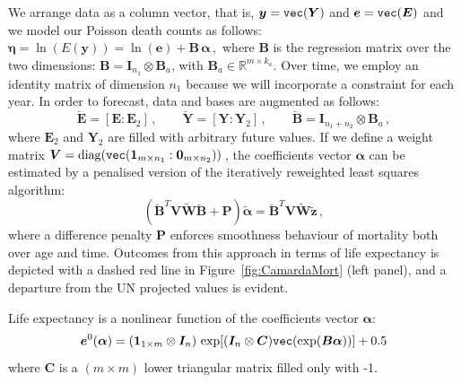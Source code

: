 \documentclass[twoside]{report}
\begin{document}
We arrange data as a column vector, that is, $\bm{y} = \verb"vec"(\bm{Y})$ and $\bm{e} = \verb"vec"(\bm{E})$ and we model our Poisson death counts as follows: $\bm{\eta} = \ln(E(\bm{y})) = \ln(\bm{e})+ \bm{B}\,\bm{\alpha}\, , $ where $\bm{B}$ is the regression matrix over the two dimensions: $\bm{B} = \bm{I}_{n_{1}} \otimes \bm{B}_{a}$, with $\bm{B}_{a} \in \mathbb{R}^{m \times k_{a}}$. Over time, we employ an identity matrix of dimension $n_{1}$ because we will incorporate a constraint for each year. In order to forecast, data and bases are augmented as follows:
\begin{equation}\label{eq:AugData}
\breve{\bm{E}} = [\bm{E} : \bm{E}_{2}]\, , \qquad 
\breve{\bm{Y}} = [\bm{Y} : \bm{Y}_{2}]\, , \qquad
\breve{\bm{B}} = \bm{I}_{n_{1}+n_{2}} \otimes \bm{B}_{a}
\, ,
\end{equation}
where $\bm{E}_{2}$ and $\bm{Y}_{2}$ are filled with arbitrary future values. If we define a weight matrix $\bm{V} = \mathrm{diag}(\verb"vec"(\bm{1}_{m\times n_{1}}:\bm{0}_{m\times n_{2}}))\,$, the coefficients vector $\bm{\alpha}$
can be estimated by a penalised version of the iteratively reweighted least squares algorithm: 
\begin{equation}\label{eq:penIRWLSfor}
(\breve{\bm{B}}^{T} \bm{V} \tilde{\bm{W}} \breve{\bm{B}} + \bm{P}) \tilde{\bm{\alpha}} =
\breve{\bm{B}}^{T}\bm{V} \tilde{\bm{W}}\tilde{\bm{z}} \, ,
\end{equation} 	
where a difference penalty $\bm{P}$ enforces smoothness behaviour of mortality both over age and time. Outcomes from this approach in terms of life expectancy is depicted with a dashed red line in Figure~\ref{fig:CamardaMort} (left panel), and a departure from the UN projected values is evident. 

Life expectancy is a nonlinear function of the coefficients vector $\bm{\alpha}$:
\begin{equation}\label{eq:e0}
\bm{e}^{0} (\bm{\alpha}) = (\bm{1}_{1 \times m} \otimes \bm{I}_{n}) \, \exp[ (\bm{I}_{n} \otimes \bm{C}) \verb"vec"(\exp(\bm{B}\bm{\alpha}))]  + 0.5 
\end{equation} 
where $\bm{C}$ is a $(m \times m)$ lower triangular matrix filled only with -1. 
\end{document}
